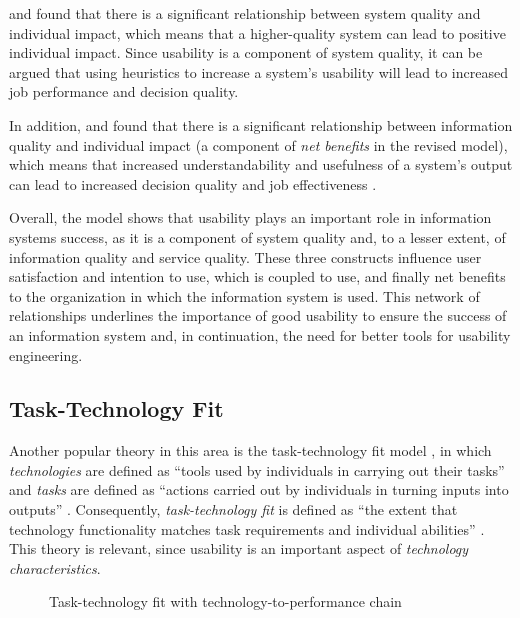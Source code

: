  and \citet{Wixom2001} found that there is a significant relationship between system quality and individual impact, which means that a higher-quality system can lead to positive individual impact. Since usability is a component of system quality, it can be argued that using heuristics to increase a system's usability will lead to increased job performance and decision quality.

In addition, \citet{Teo1998} and \citet{Wixom2001} found that there is a significant relationship between information quality and individual impact (a component of \textit{net benefits} in the revised model), which means that increased understandability and usefulness of a system's output can lead to increased decision quality and job effectiveness \citep{DeLone2003}.

Overall, the model shows that usability plays an important role in information systems success, as it is a component of system quality and, to a lesser extent, of information quality and service quality. These three constructs influence user satisfaction and intention to use, which is coupled to use, and finally net benefits to the organization in which the information system is used. This network of relationships underlines the importance of good usability to ensure the success of an information system and, in continuation, the need for better tools for usability engineering.

\subsection{Task-Technology Fit}
\label{sec:ttf}
Another popular theory in this area is the task-technology fit model \citep{Goodhue1995}, in which \textit{technologies} are defined as ``tools used by individuals in carrying out their tasks'' \citep[p.\ 1828]{Goodhue1995} and \textit{tasks} are defined as ``actions carried out by individuals in turning inputs into outputs'' \citep[p.\ 1828]{Goodhue1995}. Consequently, \textit{task-technology fit} is defined as ``the extent that technology functionality matches task requirements and individual abilities'' \citep[p.\ 1829]{Goodhue1995}. This theory is relevant, since usability is an important aspect of \textit{technology characteristics}.

\begin{figure}[htb]
	\centering
	
	\caption[Task-technology fit and technology-to-performance chain]{Task-technology fit with technology-to-performance chain \citep{Goodhue1995a}}
	\label{img:ttf}
\end{figure}

